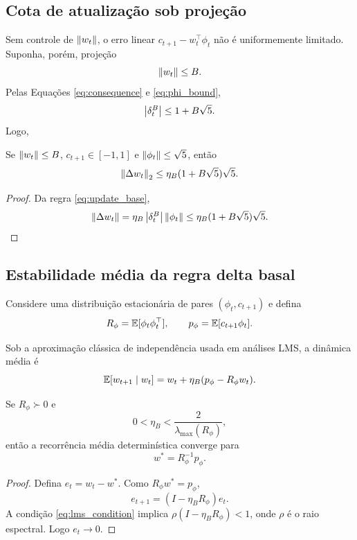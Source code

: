 \subsection{Cota de atualização sob projeção}

Sem controle de \(\left\lVert w_t \right\rVert\), o erro linear \(c_{t+1}-w_t^\top\phi_t\) não é uniformemente limitado. Suponha, porém, projeção
\begin{equation}
\left\lVert w_t \right\rVert\le B.
\end{equation}
Pelas Equações \eqref{eq:consequence} e \eqref{eq:phi_bound},
\begin{equation}
\left\lvert \delta_t^B \right\rvert
\le 1+B\sqrt5.
\end{equation}
Logo,
\begin{proposition}
Se \(\left\lVert w_t \right\rVert\le B\), \(c_{t+1}\in[-1,1]\) e \(\left\lVert \phi_t \right\rVert\le\sqrt5\), então
\begin{equation}
\left\lVert \Delta w_t \right\rVert_2
\le \eta_B(1+B\sqrt5)\sqrt5.
\end{equation}
\end{proposition}
\begin{proof}
Da regra \eqref{eq:update_base},
\[
\left\lVert \Delta w_t \right\rVert
=\eta_B\left\lvert \delta_t^B \right\rvert\left\lVert \phi_t \right\rVert
\le \eta_B(1+B\sqrt5)\sqrt5.
\]
\end{proof}

\subsection{Estabilidade média da regra delta basal}

Considere uma distribuição estacionária de pares \((\phi_t,c_{t+1})\) e defina
\begin{equation}
R_\phi=\operatorname{\mathbb{E}}[\phi_t\phi_t^\top],
\qquad
p_\phi=\operatorname{\mathbb{E}}[c_{t+1}\phi_t].
\end{equation}

Sob a aproximação clássica de independência usada em análises LMS, a dinâmica média é
\begin{equation}
\operatorname{\mathbb{E}}[w_{t+1}\mid w_t]
=w_t+\eta_B(p_\phi-R_\phi w_t).
\end{equation}

\begin{proposition}
Se \(R_\phi\succ0\) e
\begin{equation}
0<\eta_B<\frac{2}{\lambda_{\max}(R_\phi)},
\label{eq:lms_condition}
\end{equation}
então a recorrência média determinística converge para
\begin{equation}
w^*=R_\phi^{-1}p_\phi.
\end{equation}
\end{proposition}
\begin{proof}
Defina \(e_t=w_t-w^*\). Como \(R_\phi w^*=p_\phi\),
\[
e_{t+1}=(I-\eta_BR_\phi)e_t.
\]
A condição \eqref{eq:lms_condition} implica \(\rho(I-\eta_BR_\phi)<1\), onde \(\rho\) é o raio espectral. Logo \(e_t\to0\).
\end{proof}

